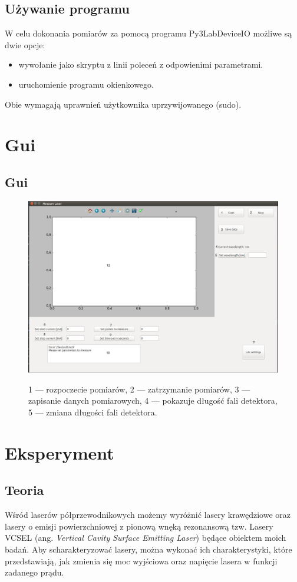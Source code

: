 \documentclass[a4paper, portrait,12pt]{report}
\begin{document}
\section{Używanie programu}
W celu dokonania pomiarów za pomocą programu Py3LabDeviceIO możliwe są dwie opcje:
\begin{itemize}
\item wywołanie jako skryptu z linii poleceń z odpowienimi parametrami.
\item uruchomienie programu okienkowego.
\end{itemize}
Obie wymagają uprawnień użytkownika uprzywijowanego (sudo).
\newpage
\chapter{Gui}
\section{Gui}
\begin{figure}[h]
\center
  \includegraphics[scale=0.35]{gui.png}
  \label{rys1}
  \caption{1 --- rozpoczecie pomiarów, 2 --- zatrzymanie pomiarów, 3 --- zapisanie danych pomiarowych, 4 --- pokazuje długość fali detektora, 5 --- zmiana długości fali detektora.} 
\end{figure}
\chapter{Eksperyment} \label{Eksperyment}
\section{Teoria}
Wśród laserów półprzewodnikowych możemy wyróżnić lasery krawędziowe oraz lasery o emisji powierzchniowej z pionową wnęką rezonansową tzw. Lasery VCSEL (ang. \textit{Vertical Cavity Surface Emitting Laser}) będące obiektem moich badań. Aby scharakteryzować lasery, można wykonać ich charakterystyki, które przedstawiają, jak zmienia się moc wyjściowa oraz napięcie lasera w funkcji zadanego prądu. \\
\end{document}
